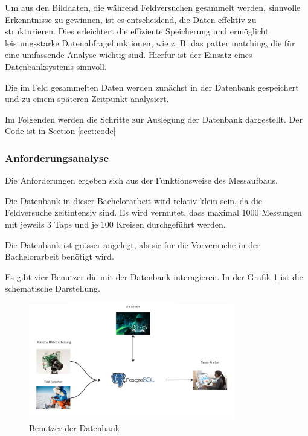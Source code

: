 
Um aus den Bilddaten, die während Feldversuchen gesammelt werden, sinnvolle Erkenntnisse zu gewinnen, ist es entscheidend, die Daten effektiv zu strukturieren. Dies erleichtert die effiziente Speicherung und ermöglicht leistungsstarke Datenabfragefunktionen, wie z. B. das patter matching, die für eine umfassende Analyse wichtig sind. Hierfür ist der Einsatz eines Datenbanksystems sinnvoll.

Die im Feld gesammelten Daten werden zunächst in der Datenbank gespeichert und zu einem späteren Zeitpunkt analysiert.

Im Folgenden werden die Schritte zur Auslegung der Datenbank dargestellt. Der Code ist in Section \ref{sect:code}

\subsubsection{Anforderungsanalyse}

Die Anforderungen ergeben sich aus der Funktionsweise des Messaufbaus.

Die Datenbank in dieser Bachelorarbeit wird relativ klein sein, da die Feldversuche zeitintensiv sind. Es wird vermutet, dass maximal 1000 Messungen mit jeweils 3 Taps und je 100 Kreisen durchgeführt werden.

Die Datenbank ist grösser angelegt, als sie für die Vorversuche in der Bachelorarbeit benötigt wird.

Es gibt vier Benutzer die mit der Datenbank interagieren. In der Grafik \ref{fig:user-db-entwurf} ist die schematische Darstellung.

\begin{figure}
    \centering
    \includegraphics[width=0.8\textwidth]{Bilder/Screenshotfrom2024-04-0115-26-08.png}
    \caption{Benutzer der Datenbank}
    \label{fig:user-db-entwurf}
\end{figure}

